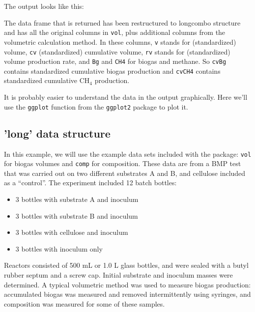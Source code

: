 \documentclass{article}
\begin{document}
The output looks like this:



The data frame that is returned has been restructured to longcombo structure and has all the original columns in \texttt{vol}, plus additional columns from the volumetric calculation method. 
In these columns, \texttt{v} stands for (standardized) volume, \texttt{cv} (standardized) cumulative volume, \texttt{rv} stands for (standardized) volume production rate, and \texttt{Bg} and \texttt{CH4} for biogas and methane.
So \texttt{cvBg} contains standardized cumulative biogas production and \texttt{cvCH4} contains standardized cumulative CH$_4$ production.

It is probably easier to understand the data in the output graphically.
Here we'll use the \texttt{ggplot} function from the \texttt{ggplot2} package to plot it.



\newpage
\subsection{'long' data structure}
In this example, we will use the example data sets included with the package: \texttt{vol} for biogas volumes and \texttt{comp} for composition.
These data are from a BMP test that was carried out on two different substrates A and B, and cellulose included as a ``control''.
The experiment included 12 batch bottles:
\begin{itemize}
  \item 3 bottles with substrate A and inoculum
  \item 3 bottles with substrate B and inoculum
  \item 3 bottles with cellulose and inoculum
  \item 3 bottles with inoculum only
\end{itemize}
Reactors consisted of 500 mL or 1.0 L glass bottles, and were sealed with a butyl rubber septum and a screw cap.
Initial substrate and inoculum masses were determined.
A typical volumetric method was used to measure biogas production: accumulated biogas was measured and removed intermittently using syringes, and composition was measured for some of these samples. 
\end{document}
